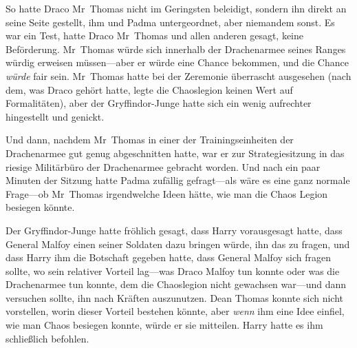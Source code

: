 So hatte Draco Mr~Thomas nicht im Geringsten beleidigt, sondern ihn direkt an seine Seite gestellt, ihm und Padma untergeordnet, aber niemandem sonst. Es war ein Test, hatte Draco Mr~Thomas und allen anderen gesagt, keine Beförderung. Mr~Thomas würde sich innerhalb der Drachenarmee seines Ranges würdig erweisen müssen—aber er würde eine Chance bekommen, und die Chance \emph{würde} fair sein. Mr~Thomas hatte bei der Zeremonie überrascht ausgesehen (nach dem, was Draco gehört hatte, legte die Chaoslegion keinen Wert auf Formalitäten), aber der Gryffindor-Junge hatte sich ein wenig aufrechter hingestellt und genickt.

Und dann, nachdem Mr~Thomas in einer der Trainingseinheiten der Drachenarmee gut genug abgeschnitten hatte, war er zur Strategiesitzung in das riesige Militärbüro der Drachenarmee gebracht worden. Und nach ein paar Minuten der Sitzung hatte Padma zufällig gefragt—als wäre es eine ganz normale Frage—ob Mr~Thomas irgendwelche Ideen hätte, wie man die Chaos Legion besiegen könnte.

Der Gryffindor-Junge hatte fröhlich gesagt, dass Harry vorausgesagt hatte, dass General Malfoy einen seiner Soldaten dazu bringen würde, ihn das zu fragen, und dass Harry ihm die Botschaft gegeben hatte, dass General Malfoy sich fragen sollte, wo sein relativer Vorteil lag—was Draco Malfoy tun konnte oder was die Drachenarmee tun konnte, dem die Chaoslegion nicht gewachsen war—und dann versuchen sollte, ihn nach Kräften auszunutzen. Dean Thomas konnte sich nicht vorstellen, worin dieser Vorteil bestehen könnte, aber \emph{wenn} ihm eine Idee einfiel, wie man Chaos besiegen konnte, würde er sie mitteilen. Harry hatte es ihm schließlich befohlen.


